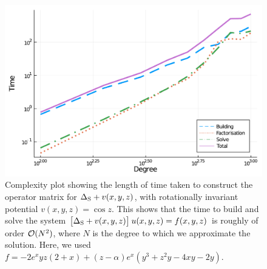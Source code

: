\documentclass[11pt, oneside]{article}   	%
\begin{document}
\begin{figure}[t]
	\centering %
	\includegraphics[scale=0.35]{complexity-Nend=1000}
	\caption{Complexity plot showing the length of time taken to construct the operator matrix for $\Delta_{\rm S} + v(x,y,z)$, with rotationally invariant potential $v(x,y,z) = \cos z$. This shows that the time to build and solve the system $\big[\Delta_{\rm S} + v(x,y,z) \big] \: u(x,y,z) = f(x,y,z)$ is roughly of order $\mathcal{O}(N^2)$, where $N$ is the degree to which we approximate the solution. Here, we used $f = -2e^{x}yz(2+x) + (z - \alpha) e^{x} (y^3 + z^2 y - 4xy - 2y)$.}
	\centering
	\label{fig:complexity}
\end{figure}
\end{document}
